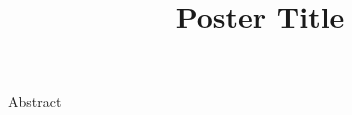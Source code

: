\documentclass{tugPoster}
\title{Poster Title}
\begin{document}
	\maketitle

\begin{IPTtwocol}
	\begin{IPTabstractblock}{Abstract}
		\lipsum[1]
	\end{IPTabstractblock}
\end{IPTtwocol}
\end{document}
